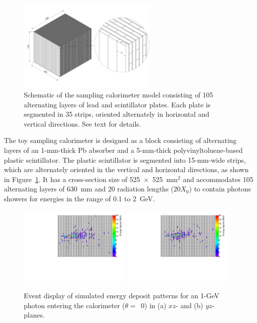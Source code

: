\documentclass[12pt,times,draftclsnofoot,a4paper]{elsarticle}
\begin{document}
\begin{figure}[!hbt]
\centering
\includegraphics[width=0.6\textwidth]{Fig1_detector_schematic.jpeg}
\caption{ Schematic of the sampling calorimeter model consisting of 105 alternating layers of lead and scintillator plates. Each plate is segmented in 35 strips, oriented alternately in horizontal and vertical directions. See text for details. }
\label{fig:det_conf}
\end{figure}

The toy sampling calorimeter is designed as a block consisting of alternating layers of an 1-mm-thick Pb absorber and a 5-mm-thick polyvinyltoluene-based plastic scintillator. The plastic scintillator is segmented into 15-mm-wide strips, which are alternately oriented in the vertical and horizontal directions, as shown in Figure~\ref{fig:det_conf}. It has a cross-section size of 525~$\times$~525~mm$^{2}$ and accommodates 105 alternating layers of 630~mm and 20 radiation lengths (20$X_{0}$) to contain photons showers for energies in the range of 0.1 to 2~GeV.

\begin{figure}[!hbt]
\centering
\includegraphics[width=0.48\textwidth]{Fig2_EMShower_XZ.pdf}
\includegraphics[width=0.48\textwidth]{Fig2_EMShower_YZ.pdf}
\caption{ Event display of simulated energy deposit patterns for an 1-GeV photon entering the calorimeter ($\theta=$~0) in (a) $xz$- and (b) $yz$-planes.}
\label{fig:Evt_Dis}
\end{figure}
\end{document}
